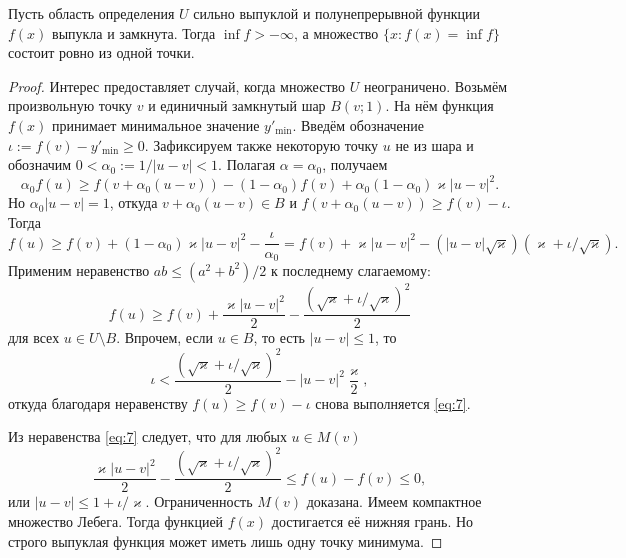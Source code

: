 \begin{theorem}
  Пусть область определения $ U $ сильно выпуклой и полунепрерывной функции $
   f(x) $ выпукла и замкнута. Тогда $ \inf f > -\infty $, а множество $
   \{x\colon f(x) = \inf f\} $ состоит ровно из одной точки.
\end{theorem}
\begin{proof}
 Интерес предоставляет случай, когда множество $ U $ неограничено. Возьмём
 произвольную точку $ v $ и единичный замкнутый шар $ B(v; 1) $. На нём функция
 $ f(x) $ принимает минимальное значение $ y'_{\min} $. Введём обозначение $
 \iota := f(v) - y'_{\min} \geqslant 0 $. Зафиксируем также некоторую точку $ u $ не
 из шара и обозначим $  0 < \alpha_0 := 1/|u-v| < 1 $. Полагая $ \alpha =
 \alpha_0 $, получаем  
 \[
     \alpha_0 f(u) \geqslant f(v + \alpha_0(u-v)) - (1-\alpha_0)f(v) +
     \alpha_0(1-\alpha_0)\varkappa|u-v|^2.
 \]
Но $ \alpha_0 |u-v| = 1 $, откуда $ v + \alpha_0(u-v) \in B $ и $
f(v+\alpha_0(u-v)) \geqslant f(v) - \iota $. Тогда  
\[
    f(u) \geqslant f(v) + (1-\alpha_0)\varkappa|u-v|^2 - \frac{\iota}{\alpha_0} = f(v) +
    \varkappa|u-v|^2-(|u-v|\sqrt\varkappa)(\varkappa + \iota/\sqrt\varkappa).
\]
Применим неравенство $ ab \leqslant (a^2+ b^2)/2 $ к последнему слагаемому: 
\begin{equation}\label{eq:7}
  f(u)\geqslant f(v) + \frac{\varkappa|u-v|^2}{2} - \frac{(\sqrt\varkappa +
\iota/\sqrt\varkappa)^2}{2}
\end{equation}
для всех $ u \in U\setminus B $. Впрочем, если $ u \in B $, то есть $
|u-v|\leqslant 1 $, то 
\[
    \iota < \frac{(\sqrt\varkappa + \iota/\sqrt\varkappa)^2}{2} -
    |u-v|^2\frac{\varkappa}{2},
\]
откуда благодаря неравенству $ f(u) \geqslant f(v) - \iota $ снова выполняется
\eqref{eq:7}. 

Из неравенства \eqref{eq:7} следует, что для любых $ u \in M(v) $  
\[
    \frac{\varkappa|u-v|^2}{2} - \frac{(\sqrt\varkappa +
    \iota/\sqrt\varkappa)^2}{2} \leqslant f(u) - f(v) \leqslant 0,
\]
или $ |u-v| \leqslant 1 + \iota/\varkappa $. Ограниченность $ M(v) $ доказана.
Имеем компактное множество Лебега. Тогда функцией $ f(x) $ достигается её нижняя
грань. Но строго выпуклая функция может иметь лишь одну точку минимума.
\end{proof}

